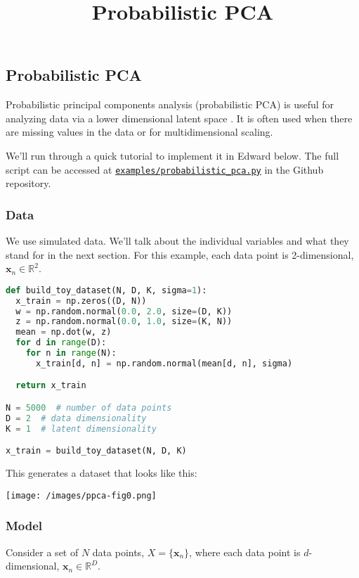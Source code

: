 \title{Probabilistic PCA}

\subsection{Probabilistic PCA}

Probabilistic principal components analysis (probabilistic PCA) is
useful for analyzing data via a lower dimensional latent space
\citep{tipping1999probabilistic}. It is often
used when there are missing values in the data or for multidimensional
scaling.

We'll run through a quick tutorial to implement it in Edward below.
The full script can be accessed at
\href{https://github.com/blei-lab/edward/blob/master/examples/probabilistic_pca.py}
{\texttt{examples/probabilistic_pca.py}} in the Github repository.

\subsubsection{Data}

We use simulated data. We'll talk about the individual variables and
what they stand for in the next section. For this example, each data
point is 2-dimensional, $\mathbf{x}_n\in\mathbb{R}^2$.

\begin{lstlisting}[language=Python]
def build_toy_dataset(N, D, K, sigma=1):
  x_train = np.zeros((D, N))
  w = np.random.normal(0.0, 2.0, size=(D, K))
  z = np.random.normal(0.0, 1.0, size=(K, N))
  mean = np.dot(w, z)
  for d in range(D):
    for n in range(N):
      x_train[d, n] = np.random.normal(mean[d, n], sigma)

  return x_train

N = 5000  # number of data points
D = 2  # data dimensionality
K = 1  # latent dimensionality

x_train = build_toy_dataset(N, D, K)
\end{lstlisting}

This generates a dataset that looks like this:

\texttt{[image: /images/ppca-fig0.png]}

\subsubsection{Model}

Consider a set of $N$ data points, $X = \{\mathbf{x}_n\}$, where each
data point is $d$-dimensional, $\mathbf{x}_n \in \mathbb{R}^D$.

